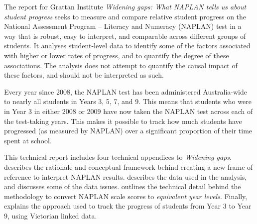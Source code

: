 \begin{overview}
\raggedright

The report for Grattan Institute \textit{Widening gaps: What NAPLAN tells us about student progress} seeks to measure and compare relative student progress on the National Assessment Program -- Literacy and Numeracy (NAPLAN) test in a way that is robust, easy to interpret, and comparable across different groups of students. It analyses student-level data to identify some of the factors associated with higher or lower rates of progress, and to quantify the degree of these associations. The analysis does not attempt to quantify the causal impact of these factors, and should not be interpreted as such.

Every year since 2008, the NAPLAN test has been administered Australia-wide to nearly all students in Years 3, 5, 7, and 9. This means that students who were in Year 3 in either 2008 or 2009 have now taken the NAPLAN test across each of the test-taking years. This makes it possible to track how much students have progressed (as measured by NAPLAN) over a significant proportion of their time spent at school.

This technical report includes four technical appendices to \textit{Widening gaps}.  describes the rationale and conceptual framework behind creating a new frame of reference to interpret NAPLAN results.  describes the data used in the analysis, and discusses some of the data issues.  outlines the technical detail behind the methodology to convert NAPLAN scale scores to \textit{equivalent year levels}. Finally,  explains the approach used to track the progress of students from Year 3 to Year 9, using Victorian linked data.

\end{overview}